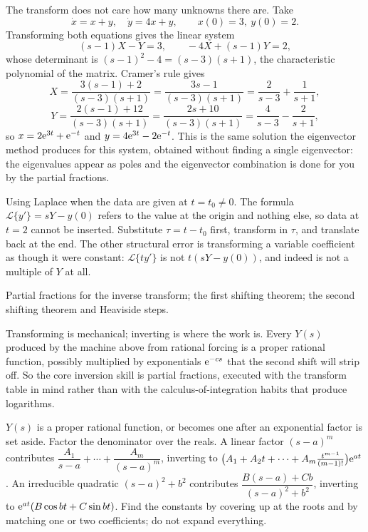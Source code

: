 \begin{worked}
The transform does not care how many unknowns there are. Take
\[\dot x=x+y,\quad \dot y=4x+y,\qquad x(0)=3,\ y(0)=2.\]
Transforming both equations gives the linear system
\[(s-1)X-Y=3,\qquad -4X+(s-1)Y=2,\]
whose determinant is $(s-1)^{2}-4=(s-3)(s+1)$, the characteristic polynomial of the matrix. Cramer's rule gives
\[X=\frac{3(s-1)+2}{(s-3)(s+1)}=\frac{3s-1}{(s-3)(s+1)}=\frac{2}{s-3}+\frac{1}{s+1},\]
\[Y=\frac{2(s-1)+12}{(s-3)(s+1)}=\frac{2s+10}{(s-3)(s+1)}=\frac{4}{s-3}-\frac{2}{s+1},\]
so $x=2\mathrm{e}^{3t}+\mathrm{e}^{-t}$ and $y=4\mathrm{e}^{3t}-2\mathrm{e}^{-t}$. This is the same solution the eigenvector method produces for this system, obtained without finding a single eigenvector: the eigenvalues appear as poles and the eigenvector combination is done for you by the partial fractions.
\end{worked}

\begin{trap}
Using Laplace when the data are given at $t=t_0\ne0$. The formula $\mathcal{L}\{y'\}=sY-y(0)$ refers to the value at the origin and nothing else, so data at $t=2$ cannot be inserted. Substitute $\tau=t-t_0$ first, transform in $\tau$, and translate back at the end. The other structural error is transforming a variable coefficient as though it were constant: $\mathcal{L}\{ty'\}$ is not $t(sY-y(0))$, and indeed is not a multiple of $Y$ at all.
\end{trap}

\begin{seealsob}Partial fractions for the inverse transform; the first shifting theorem; the second shifting theorem and Heaviside steps.\end{seealsob}

Transforming is mechanical; inverting is where the work is. Every $Y(s)$ produced by the machine above from rational forcing is a proper rational function, possibly multiplied by exponentials $\mathrm{e}^{-cs}$ that the second shift will strip off. So the core inversion skill is partial fractions, executed with the transform table in mind rather than with the calculus-of-integration habits that produce logarithms.

\cue $Y(s)$ is a proper rational function, or becomes one after an exponential factor is set aside.
\method Factor the denominator over the reals. A linear factor $(s-a)^{m}$ contributes $\dfrac{A_1}{s-a}+\cdots+\dfrac{A_m}{(s-a)^{m}}$, inverting to $\bigl(A_1+A_2t+\cdots+A_m\tfrac{t^{m-1}}{(m-1)!}\bigr)\mathrm{e}^{at}$. An irreducible quadratic $(s-a)^{2}+b^{2}$ contributes $\dfrac{B(s-a)+Cb}{(s-a)^{2}+b^{2}}$, inverting to $\mathrm{e}^{at}(B\cos bt+C\sin bt)$. Find the constants by covering up at the roots and by matching one or two coefficients; do not expand everything.

